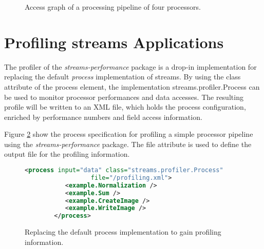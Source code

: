 \documentclass[german,a4,12pt]{scrartcl}
\begin{document}
\begin{figure}[h!]
\centering
{}
\caption{\label{fig:access-graph}Access graph of a processing pipeline of four processors.}
\end{figure}


\section{Profiling streams Applications}
The profiler of the {\em streams-performance} package is a drop-in implementation for replacing
the default {\em process} implementation of \textsf{streams}. By using the {\ttfamily class}
attribute of the process element, the implementation {\ttfamily streams.profiler.Process} can
be used to monitor processor performances and data accesses. The resulting profile will be
written to an XML file, which holds the process configuration, enriched by performance numbers
and field access information.

Figure \ref{fig:profilerExample} show the process specification for profiling a simple processor
pipeline using the {\em streams-performance} package. The {\ttfamily file} attribute is used to
define the output file for the profiling information.

\begin{figure}[h!]
\centering
\begin{lstlisting}[language=XML]
        <process input="data" class="streams.profiler.Process"
                  file="/profiling.xml">
           <example.Normalization />
           <example.Sum />
           <example.CreateImage />
           <example.WriteImage />
        </process>
\end{lstlisting}
\caption{\label{fig:profilerExample}Replacing the default process implementation to gain profiling information.}
\end{figure}
\end{document}
